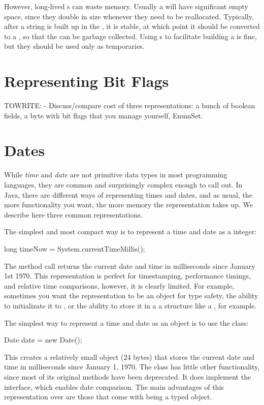 However, long-lived s can waste memory. Usually a
 will have significant empty space, since they double in
size whenever they need to be reallocated. Typically, after a string is built up in the
, it is stable, at which point it should be converted 
to a , so that the  can be
garbage collected. Using s to facilitate
building a  is fine, but they should be used only as temporaries.

\section{Representing Bit Flags}
\label{sec:bit-flags}
TOWRITE:
- Discuss/compare cost of three representations: a bunch of boolean fields, a
byte with bit flags that you manage yourself, EnumSet.

\section{Dates}

While \textit{time} and \textit{date} are not primitive data types in most
programming languages, they are common and surprisingly complex enough to call
out. In Java, there are different ways of representing times and dates, and as
usual, the more functionality you want, the more memory the representation takes
up. We describe here three common representations.

The simplest and most compact way is to represent a time and date as a
 integer:
\begin{shortlisting}
    long timeNow = System.currentTimeMillis();
\end{shortlisting}
The method call  returns the current 
date and time in milliseconds since January 1st 1970.  This representation is
perfect for timestamping, performance timings, and relative time
comparisons, however, it is clearly limited. For example, sometimes you want the
representation to be an object for type safety, the ability to initializate it
to , or the ability to store it in a a structure like a
, for example.

The simplest way to represent a time and date as an object is to use the
 class:
\begin{shortlisting}
    Date date = new Date();
\end{shortlisting}
This creates a relatively small object (24 bytes) that stores the current date
and time in milliseconds since January 1, 1970. The class  has
little other functionality, since most of its original methods have been
deprecated. It does implement the  interface, which enables
date comparison. The main advantages of this representation over  are
those that come with being a typed object.



